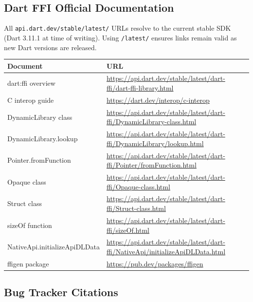 \documentclass[11pt,a4paper]{article}
\newcommand{\code}[1]{\texttt{#1}}
\begin{document}
\subsection{Dart FFI Official Documentation}

All \code{api.dart.dev/stable/latest/} URLs resolve to the current stable SDK
(Dart 3.11.1 at time of writing). Using \code{/latest/} ensures links remain
valid as new Dart versions are released.

\begin{table}[ht]
\centering\small
\begin{tabularx}{\textwidth}{lL}
  \toprule
  \textbf{Document} & \textbf{URL} \\
  \midrule
  dart:ffi overview         & \url{https://api.dart.dev/stable/latest/dart-ffi/dart-ffi-library.html} \\
  C interop guide           & \url{https://dart.dev/interop/c-interop} \\
  DynamicLibrary class      & \url{https://api.dart.dev/stable/latest/dart-ffi/DynamicLibrary-class.html} \\
  DynamicLibrary.lookup     & \url{https://api.dart.dev/stable/latest/dart-ffi/DynamicLibrary/lookup.html} \\
  Pointer.fromFunction      & \url{https://api.dart.dev/stable/latest/dart-ffi/Pointer/fromFunction.html} \\
  Opaque class              & \url{https://api.dart.dev/stable/latest/dart-ffi/Opaque-class.html} \\
  Struct class              & \url{https://api.dart.dev/stable/latest/dart-ffi/Struct-class.html} \\
  sizeOf function           & \url{https://api.dart.dev/stable/latest/dart-ffi/sizeOf.html} \\
  NativeApi.initializeApiDLData & \url{https://api.dart.dev/stable/latest/dart-ffi/NativeApi/initializeApiDLData.html} \\
  ffigen package            & \url{https://pub.dev/packages/ffigen} \\
  \bottomrule
\end{tabularx}
\end{table}

\subsection{Bug Tracker Citations}
\end{document}
